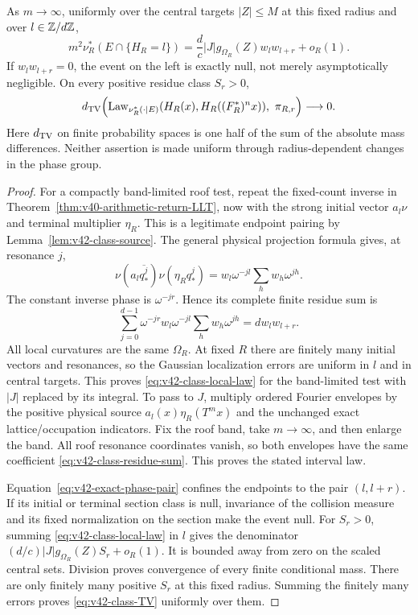 \begin{theorem}
\label{thm:v42-endpoint-posterior}
As $m\to\infty$, uniformly over the central targets $|Z|\le M$ at
this fixed radius and over $l\in\mathbb Z/d\mathbb Z$,
\begin{equation}\label{eq:v42-class-local-law}
 m^2\nu_R^*(E\cap\{H_R=l\})
       =\frac d c |J|g_{\Omega_R}(Z)w_lw_{l+r}+o_R(1).
\end{equation}
If $w_lw_{l+r}=0$, the event on the left is exactly null, not merely
asymptotically negligible. On every positive residue class $S_r>0$,
\begin{equation}\label{eq:v42-class-TV}
 d_{\rm TV}\!\left(
 \operatorname{Law}_{\nu_R^*(\cdot\mid E)}
       (H_R(x),H_R((F_R^*)^nx)),\ \pi_{R,r}\right)\longrightarrow0.
\end{equation}
Here $d_{\rm TV}$ on finite probability spaces is one half of the
sum of the absolute mass differences. Neither assertion is made
uniform through radius-dependent changes in the phase group.
\end{theorem}
\begin{proof}
For a compactly band-limited roof test, repeat the fixed-count inverse
in Theorem~\ref{thm:v40-arithmetic-return-LLT}, now with the strong
initial vector $a_l\nu$ and terminal multiplier $\eta_R$. This is a
legitimate endpoint pairing by Lemma~\ref{lem:v42-class-source}.
The general physical projection formula gives, at resonance $j$,
\[
 \nu(a_l\overline{q_*^j})\nu(\eta_Rq_*^j)
       =w_l\omega^{-jl}\sum_hw_h\omega^{jh}.
\]
The constant inverse phase is $\omega^{-jr}$. Hence its complete
finite residue sum is
\begin{equation}\label{eq:v42-class-residue-sum}
 \sum_{j=0}^{d-1}\omega^{-jr}
        w_l\omega^{-jl}\sum_hw_h\omega^{jh}
                          =d w_lw_{l+r}.
\end{equation}
All local curvatures are the same $\Omega_R$. At fixed $R$ there are
finitely many initial vectors and resonances, so the Gaussian
localization errors are uniform in $l$ and in central targets. This
proves \eqref{eq:v42-class-local-law} for the band-limited test with
$|J|$ replaced by its integral. To pass to $J$, multiply ordered
Fourier envelopes by the positive physical source $a_l(x)\eta_R(T^mx)$
and the unchanged exact lattice/occupation indicators. Fix the roof
band, take $m\to\infty$, and then enlarge the band. All roof resonance
coordinates vanish, so both envelopes have the same coefficient
\eqref{eq:v42-class-residue-sum}. This proves the stated interval law.

Equation~\eqref{eq:v42-exact-phase-pair} confines the endpoints to the
pair $(l,l+r)$. If its initial or terminal section class is null,
invariance of the collision measure and its fixed normalization on the
section make the event null. For $S_r>0$, summing
\eqref{eq:v42-class-local-law} in $l$ gives the denominator
$(d/c)|J|g_{\Omega_R}(Z)S_r+o_R(1)$. It is bounded away from zero
on the scaled central sets. Division proves convergence of every
finite conditional mass. There are only finitely many positive $S_r$
at this fixed radius. Summing the finitely many errors proves
\eqref{eq:v42-class-TV} uniformly over them.
\end{proof}

